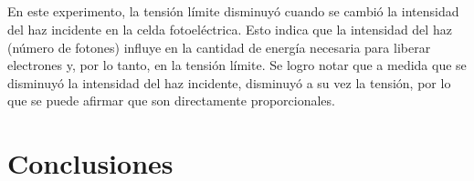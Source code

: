 \documentclass[letterpaper, 12pt]{article}
\begin{document}
\subsection{}

En este experimento, la tensión límite disminuyó cuando se
cambió la intensidad del haz incidente en la celda
fotoeléctrica. Esto indica que la intensidad del haz
(número de fotones) influye en la cantidad de energía
necesaria para liberar electrones y, por lo tanto, en la
tensión límite. Se logro notar que a medida que se
disminuyó la intensidad del haz incidente, disminuyó a su
vez la tensión, por lo que se puede afirmar que son
directamente proporcionales.

\subsection{}

\section{Conclusiones}

\printbibliography
\end{document}
